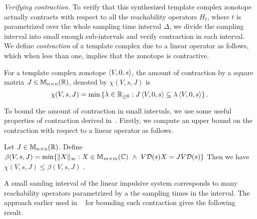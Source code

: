\emph{Verifying contraction.}  To verify that this
synthesized template complex zonotope actually contracts with respect
to all the reachability operators $H_t$, where $t$ is parametrized over
the whole sampling time interval $\Delta$, we divide the
sampling interval into small enough sub-intervals and verify
contraction in each interval.  We define \emph{contraction} of a
template complex due to a linear operator as follows, which when less
than one, implies that the zonotope is contractive.
%
\begin{defn}
For a template complex zonotope $\left<V,0,s\right>$, the amount of contraction by a
square matrix $J\in\mathbb{M}_{n\times n}(\mathbb{R})$, denoted by $\chi(V,s,J)$
is \[\chi(V,s,J)=\min\left\{\lambda\in\mathbb{R}_{\geq 0}:J\left<V,0,s\right>\subseteq
\lambda\left<V,0,s\right>\right\}.\]
\end{defn}
%
To bound the amount of contraction in small intervals, we use some
useful properties of contraction derived in~\cite{arvind2016lis}.
Firstly, we compute an upper bound on the contraction with respect to
a linear operator as follows.
\begin{lem}\label{lem:contLin}
Let $J\in\mathbb{M}_{n\times n}(\mathbb{R})$.  Define
%
$
\beta(V,s,J)=\min\{\|X\|_\infty:X\in\mathbb{M}_{m\times m}(\mathbb{C})~\wedge~
V\mathcal{D}(s)X=JV\mathcal{D}(s)\}$
Then we have $\chi(V,s,J)\leq \beta(V,s,J)$ .
%
\end{lem}
A small samling interval of the linear impulsive system corresponds to
many reachability operators parametrized by a the sampling times in
the interval.  The approach earlier used in ~\cite{arvind2016lis} for
bounding such contraction gives the following result.



